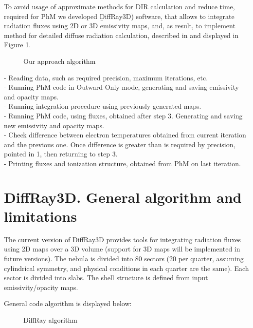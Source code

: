 \documentclass[a4paper]{article}
\begin{document}
To avoid usage of approximate methods for DIR calculation and reduce time, 
required for PhM we developed {\b DiffRay3D}) software, that allows to integrate
radiation fluxes using 2D or 3D emissivity maps, and, as result, to implement 
method for detailed diffuse radiation calculation, described in \cite{JPS2016}
and displayed in Figure \ref{our_approach}.

\begin{figure}[!h]
\centering
\begin{minipage}[t]{.45\linewidth}
\centering
{}
\caption{Our approach algorithm}\label{our_approach}
\end{minipage}
\hfill
\end{figure}

 - Reading data, such as required precision, maximum iterations, etc.\\
 - Running PhM code in Outward Only mode, generating and saving emissivity and opacity maps.\\
 - Running integration procedure using previously generated maps.\\
 - Running PhM code, using fluxes, obtained after step 3. Generating and saving new emissivity and opacity maps.\\
 - Check difference between electron temperatures obtained from current iteration and the previous one. Once difference is greater than is required by precision, pointed in 1, then returning to step 3.\\
 - Printing fluxes and ionization structure, obtained from PhM on last iteration.\\


\section{DiffRay3D. General algorithm and limitations}

The current version of DiffRay3D provides tools for integrating radiation fluxes using 2D maps over a 3D volume (support for 3D maps will be implemented in future versions). The nebula is divided into 80 sectors (20 per quarter, assuming cylindrical symmetry, and physical conditions in each quarter are the same). Each sector is divided into slabs. The shell structure is defined from input emissivity/opacity maps.

General code algorithm is displayed below:

\begin{figure}
    \begin{minipage}[t]{.45\linewidth}
        \centering
        \caption{DiffRay algorithm}\label{diffray_algo}
    \end{minipage}
\end{figure}
\end{document}
